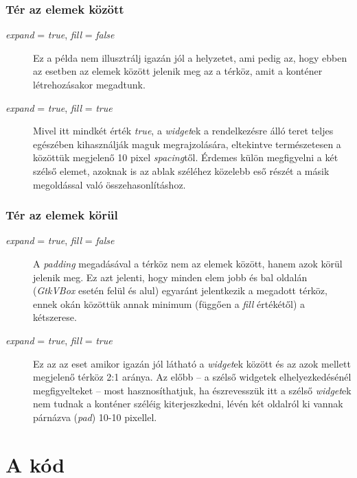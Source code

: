 \documentclass[a4paper,10pt]{article}
\begin{document}
\subsubsection{Tér az elemek között}

\begin{description}
 \item[\textit{expand} = \textit{true}, \textit{fill} = \textit{false}] Ez a példa nem illusztrálj igazán jól a helyzetet, ami pedig az, hogy ebben az esetben az elemek között jelenik meg az a térköz, amit a konténer létrehozásakor megadtunk.

 \item[\textit{expand} = \textit{true}, \textit{fill} = \textit{true}] Mivel itt mindkét érték \textit{true}, a \textit{widget}ek a rendelkezésre álló teret teljes egészében kihasználják maguk megrajzolására, eltekintve természetesen a közöttük megjelenő 10 pixel \textit{spacing}től. Érdemes külön megfigyelni a két szélső elemet, azoknak is az ablak széléhez közelebb eső részét a másik megoldással való összehasonlításhoz.
\end{description}

\subsubsection{Tér az elemek körül}

\begin{description}
 \item[\textit{expand} = \textit{true}, \textit{fill} = \textit{false}] A \textit{padding} megadásával a térköz nem az elemek között, hanem azok körül jelenik meg. Ez azt jelenti, hogy minden elem jobb és bal oldalán (\textit{GtkVBox} esetén felül és alul) egyaránt jelentkezik a megadott térköz, ennek okán közöttük annak minimum (függően a \textit{fill} értékétől) a kétszerese.

 \item[\textit{expand} = \textit{true}, \textit{fill} = \textit{true}] Ez az az eset amikor igazán jól látható a \textit{widget}ek között és az azok mellett megjelenő térköz 2:1 aránya. Az előbb -- a szélső widgetek elhelyezkedésénél megfigyelteket -- most hasznosíthatjuk, ha észrevesszük itt a szélső \textit{widget}ek nem tudnak a konténer széléig kiterjeszkedni, lévén két oldalról ki vannak párnázva (\textit{pad}) 10-10 pixellel.
\end{description}

\section{A kód}
\end{document}
